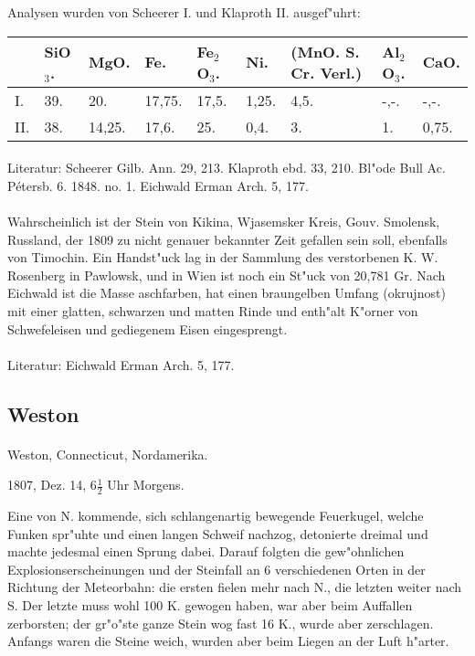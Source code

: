 \documentclass[a4paper, 11pt, oneside]{article}
\begin{document}
Analysen wurden von Scheerer I. und Klaproth II. ausgef"uhrt:
\begin{table}[!ht]
    \centering
    \footnotesize
    \begin{tabular}{l l l l l l p{25mm} l l}
         & SiO$_{3}$. & MgO. & Fe. & Fe$_{2}$O$_{3}$. & Ni. & (MnO. S. Cr. Verl.) & Al$_{2}$O$_{3}$. & CaO. \\ \hline
        I. & 39. & 20. & 17,75. & 17,5. & 1,25. & 4,5. & -,-. & -,-. \\
        II. & 38. & 14,25. & 17,6. & 25. & 0,4. & 3. & 1. & 0,75. \\
    \end{tabular}
\end{table}
\footnotesize
\paragraph{}
Literatur: Scheerer Gilb. Ann. 29, 213. Klaproth ebd. 33, 210. Bl"ode Bull Ac. Pétersb. 6. 1848. no. 1. Eichwald Erman Arch. 5, 177.
\normalsize
\paragraph{}
Wahrscheinlich ist der Stein von Kikina, Wjasemsker Kreis, Gouv. Smolensk, Russland, der 1809 zu nicht genauer bekannter Zeit gefallen sein soll, ebenfalls von Timochin. Ein Handst"uck lag in der Sammlung des verstorbenen K. W. Rosenberg in Pawlowsk, und in Wien ist noch ein St"uck von 20,781 Gr. Nach Eichwald ist die Masse aschfarben, hat einen braungelben Umfang (okrujnost) mit einer glatten, schwarzen und matten Rinde und enth"alt K"orner von Schwefeleisen und gediegenem Eisen eingesprengt.
\footnotesize
\paragraph{}
Literatur: Eichwald Erman Arch. 5, 177.
\subsection{Weston}
\normalsize
\paragraph{}
Weston, Connecticut, Nordamerika.

1807, Dez. 14, $6\frac{1}{2}$ Uhr Morgens.

Eine von N. kommende, sich schlangenartig bewegende Feuerkugel, welche Funken spr"uhte und einen langen Schweif nachzog, detonierte dreimal und machte jedesmal einen Sprung dabei. Darauf folgten die gew"ohnlichen Explosionserscheinungen und der Steinfall an 6 verschiedenen Orten in der Richtung der Meteorbahn: die ersten fielen mehr nach N., die letzten weiter nach S. Der letzte muss wohl 100 K. gewogen haben, war aber beim Auffallen zerborsten; der gr"o"ste ganze Stein wog fast 16 K., wurde aber zerschlagen. Anfangs waren die Steine weich, wurden aber beim Liegen an der Luft h"arter.
\end{document}
